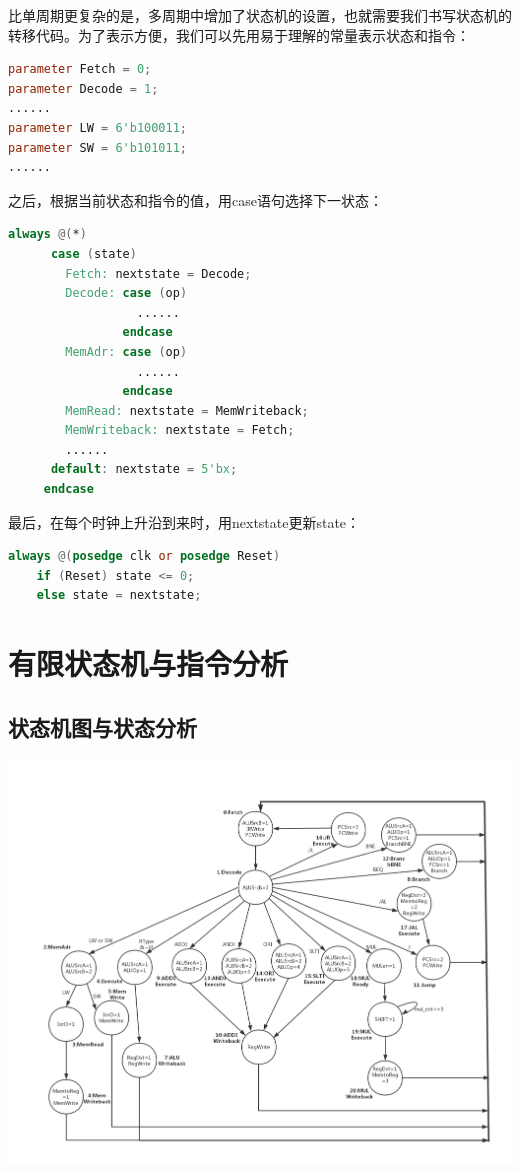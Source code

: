 \documentclass[12pt]{article} %
\begin{document}
\begin{sloppypar}
比单周期更复杂的是，多周期中增加了状态机的设置，也就需要我们书写状态机的转移代码。为了表示方便，我们可以先用易于理解的常量表示状态和指令：
\begin{lstlisting}[language=Verilog]  
parameter Fetch = 0;
parameter Decode = 1;
......
parameter LW = 6'b100011;
parameter SW = 6'b101011;
......
\end{lstlisting}  

之后，根据当前状态和指令的值，用case语句选择下一状态：
\begin{lstlisting}[language=Verilog]  
always @(*)
      case (state)
        Fetch: nextstate = Decode;
        Decode: case (op)
                  ......
                endcase
        MemAdr: case (op)
                  ......
                endcase
        MemRead: nextstate = MemWriteback;
        MemWriteback: nextstate = Fetch;
        ......
	  default: nextstate = 5'bx;
     endcase
\end{lstlisting}  

最后，在每个时钟上升沿到来时，用nextstate更新state：
\begin{lstlisting}[language=Verilog]  
always @(posedge clk or posedge Reset)
    if (Reset) state <= 0;
    else state = nextstate;
\end{lstlisting}  

\newpage
\section{有限状态机与指令分析}

\subsection{状态机图与状态分析}
\noindent
\includegraphics[width =\linewidth]{figure/State.jpg}


\end{sloppypar}
\end{document}
